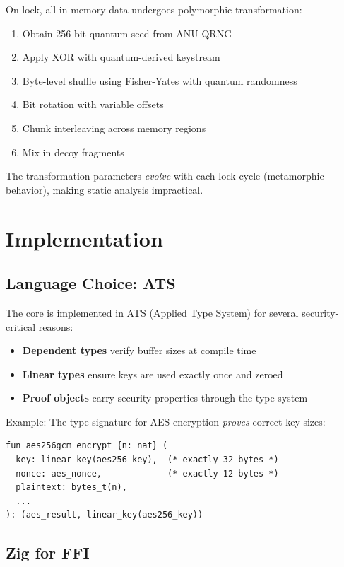 \documentclass[11pt,a4paper]{article}
\begin{document}
On lock, all in-memory data undergoes polymorphic transformation:

\begin{enumerate}
    \item Obtain 256-bit quantum seed from ANU QRNG
    \item Apply XOR with quantum-derived keystream
    \item Byte-level shuffle using Fisher-Yates with quantum randomness
    \item Bit rotation with variable offsets
    \item Chunk interleaving across memory regions
    \item Mix in decoy fragments
\end{enumerate}

The transformation parameters \textit{evolve} with each lock cycle (metamorphic behavior), making static analysis impractical.

\section{Implementation}

\subsection{Language Choice: ATS}

The core is implemented in ATS (Applied Type System) for several security-critical reasons:

\begin{itemize}
    \item \textbf{Dependent types} verify buffer sizes at compile time
    \item \textbf{Linear types} ensure keys are used exactly once and zeroed
    \item \textbf{Proof objects} carry security properties through the type system
\end{itemize}

Example: The type signature for AES encryption \textit{proves} correct key sizes:

\begin{lstlisting}
fun aes256gcm_encrypt {n: nat} (
  key: linear_key(aes256_key),  (* exactly 32 bytes *)
  nonce: aes_nonce,             (* exactly 12 bytes *)
  plaintext: bytes_t(n),
  ...
): (aes_result, linear_key(aes256_key))
\end{lstlisting}

\subsection{Zig for FFI}
\end{document}
